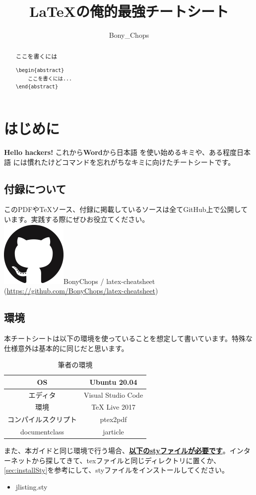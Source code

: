 \documentclass[a4j, titlepage]{jarticle}
\title{\LaTeX の俺的最強チートシート}
\author{Bony\_Chops}
\newcommand{\GitHub}{\includegraphics[scale=0.07]{image/github.png}}
\begin{document}
\maketitle
\begin{abstract}
    ここを書くには
    \begin{lstlisting}
\begin{abstract}
    ここを書くには...
\end{abstract}
    \end{lstlisting}
\end{abstract}

\setcounter{section}{-1}
\section{はじめに}
\textbf{Hello hackers!} これから\textbf{Word}から日本語 を使い始めるキミや、ある程度日本語 には慣れたけどコマンドを忘れがちなキミに向けたチートシートです。
\subsection{付録について}
このPDFや\TeX ソース、付録に掲載しているソースは全てGitHub上で公開しています。実践する際にぜひお役立てください。\\
\GitHub BonyChops / latex-cheatsheet (\url{https://github.com/BonyChops/latex-cheatsheet})
\subsection{環境}
本チートシートは以下の環境を使っていることを想定して書いています。特殊な仕様意外は基本的に同じだと思います。

\begin{table}[htbp]
    \center
    \caption{筆者の環境}
    \begin{tabular}{|c|c|} \hline
        OS & Ubuntu 20.04 \\ \hline
        エディタ & Visual Studio Code \\ \hline
        環境 & TeX Live 2017 \\ \hline
        コンパイルスクリプト & ptex2pdf \\ \hline
        documentclass & jarticle \\ \hline
    \end{tabular}
\end{table}

また、本ガイドと同じ環境で行う場合、\textbf{\underline{以下のstyファイルが必要です}}。インターネットから探してきて、texファイルと同じディレクトリに置くか、\ref{sec:installSty}を参考にして、styファイルをインストールしてください。
\begin{itemize}
    \item jlisting.sty
\end{itemize}
\end{document}
